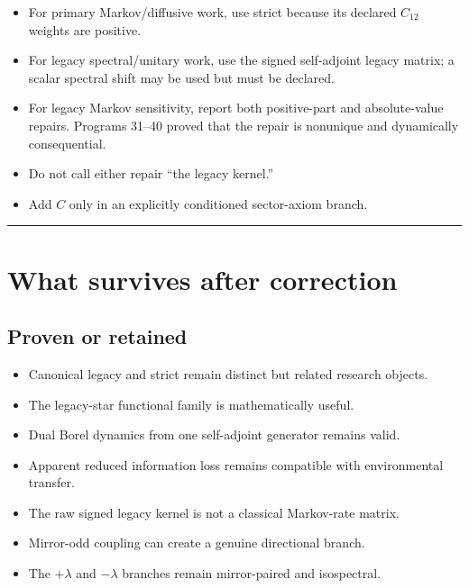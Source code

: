 \documentclass[11pt,a4paper,openany]{report}
\begin{document}
\begin{itemize}
\item 
For primary Markov/\allowbreak{}diffusive work, use strict because its declared \(C_{12}\) weights are positive.

\item 
For legacy spectral/\allowbreak{}unitary work, use the signed self-adjoint legacy matrix; a scalar spectral shift may be used but must be declared.

\item 
For legacy Markov sensitivity, report both positive-part and absolute-value repairs. Programs 31–40 proved that the repair is nonunique and dynamically consequential.

\item 
Do not call either repair “the legacy kernel.”

\item 
Add \(C\) only in an explicitly conditioned sector-axiom branch.

\end{itemize}

\par\medskip\hrule\medskip

\chapter{What survives after correction}

\section{Proven or retained}

\begin{itemize}
\item 
Canonical legacy and strict remain distinct but related research objects.

\item 
The legacy-star functional family is mathematically useful.

\item 
Dual Borel dynamics from one self-adjoint generator remains valid.

\item 
Apparent reduced information loss remains compatible with environmental transfer.

\item 
The raw signed legacy kernel is not a classical Markov-rate matrix.

\item 
Mirror-odd coupling can create a genuine directional branch.

\item 
The \(+\lambda\) and \(-\lambda\) branches remain mirror-paired and isospectral.

\end{itemize}
\end{document}
